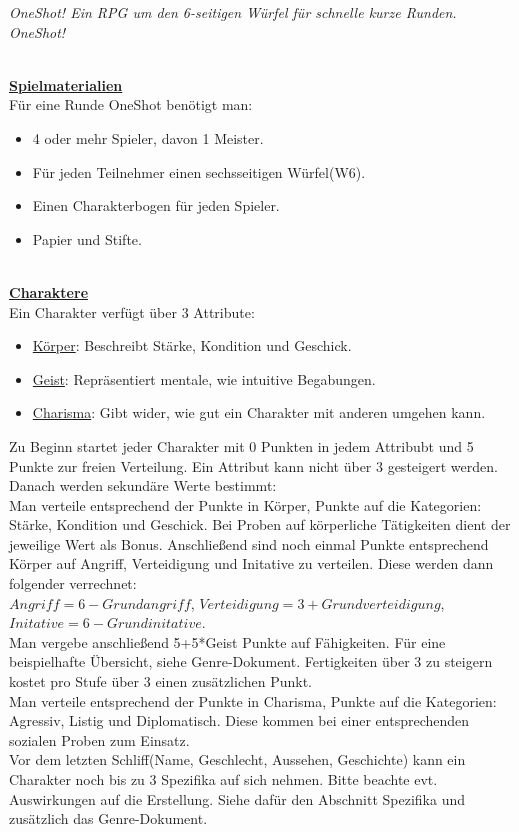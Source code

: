\documentclass[twoside,a4paper]{minimal}
\begin{document}
\textit{OneShot! Ein RPG um den 6-seitigen Würfel für schnelle kurze Runden. OneShot!}
\setlength{\columnsep}{5pt}
\begin{multicols*}{3}
\textbf{\uline{\\Spielmaterialien}}
\\Für eine Runde OneShot benötigt man:
\begin{itemize}
\item 4 oder mehr Spieler, davon 1 Meister.
\item Für jeden Teilnehmer einen sechsseitigen Würfel(W6).
\item Einen Charakterbogen für jeden Spieler.
\item Papier und Stifte.
\end{itemize}
\textbf{\uline{\\Charaktere}}
\\Ein Charakter verfügt über 3 Attribute:
\begin{itemize}
\item \uline{Körper}: Beschreibt Stärke, Kondition und Geschick. 
\item \uline{Geist}: Repräsentiert mentale, wie intuitive Begabungen.
\item \uline{Charisma}: Gibt wider, wie gut ein Charakter mit anderen umgehen kann.
\end{itemize}
Zu Beginn startet jeder Charakter mit 0 Punkten in jedem Attribubt und 5 Punkte zur freien Verteilung. Ein Attribut kann nicht über 3 gesteigert werden. Danach werden sekundäre Werte bestimmt:
\\Man verteile entsprechend der Punkte in Körper, Punkte auf die Kategorien: Stärke, Kondition und Geschick. Bei Proben auf körperliche Tätigkeiten dient der jeweilige Wert als Bonus. Anschließend sind noch einmal Punkte entsprechend Körper auf Angriff, Verteidigung und Initative zu verteilen. Diese werden dann folgender verrechnet:\\$Angriff=6-Grundangriff$, $Verteidigung=3+Grundverteidigung$, $Initative=6-Grundinitative$.
\\Man vergebe anschließend 5+5*Geist Punkte auf Fähigkeiten. Für eine beispielhafte Übersicht, siehe Genre-Dokument. Fertigkeiten über 3 zu steigern kostet pro Stufe über 3 einen zusätzlichen Punkt.
\\Man verteile entsprechend der Punkte in Charisma, Punkte auf die Kategorien: Agressiv, Listig und Diplomatisch. Diese kommen bei einer entsprechenden sozialen Proben zum Einsatz.
\\Vor dem letzten Schliff(Name, Geschlecht, Aussehen, Geschichte) kann ein Charakter noch bis zu 3 Spezifika auf sich nehmen. Bitte beachte evt. Auswirkungen auf die Erstellung. Siehe dafür den Abschnitt Spezifika und zusätzlich das Genre-Dokument.

\end{multicols*}
\end{document}
